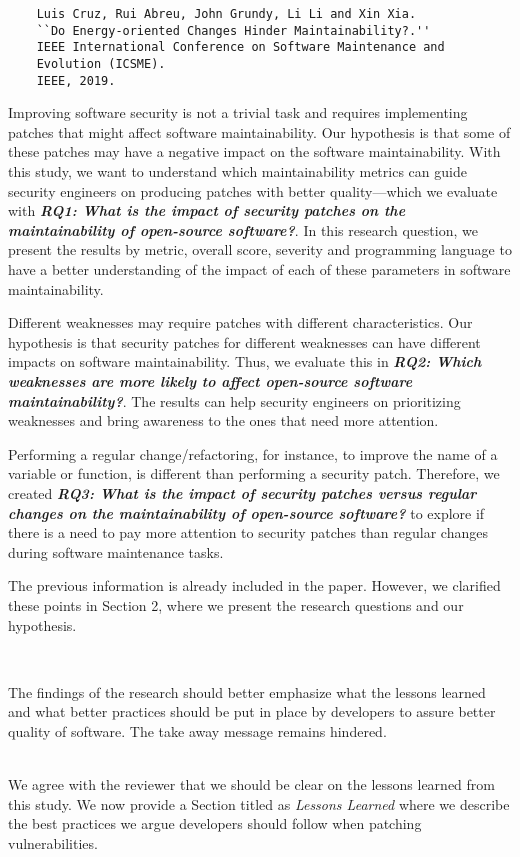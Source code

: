 \documentclass[11pt,fleqn]{article}
\newcommand{\eline}{\vspace*{.75\baselineskip}}
\newcommand{\Referee}[1]{\eline \noindent {\bf Reviewer comment #1:} \\}
\newcommand{\Us}{\eline \noindent {\bf Response:}\\}
\newenvironment{revcomment}[1][]
{\Referee{#1}\begin{rcomment}}
{\end{rcomment}}
\begin{document}
\begin{verbatim}
    Luis Cruz, Rui Abreu, John Grundy, Li Li and Xin Xia. 
    ``Do Energy-oriented Changes Hinder Maintainability?.'' 
    IEEE International Conference on Software Maintenance and 
    Evolution (ICSME). 
    IEEE, 2019.
\end{verbatim}

Improving software security is not a trivial task and 
requires implementing patches that might affect software 
maintainability. Our hypothesis is that some of these patches may 
have a negative impact on the software maintainability. With this 
study, we want to understand which maintainability metrics can guide 
security engineers on producing patches with better quality---which 
we evaluate with \textit{\textbf{RQ1: What is the impact of security patches on the
maintainability of open-source software?}}. In this research 
question, we present the results by metric, overall score, severity and programming language
to have a better understanding of the impact of each of these parameters in 
software maintainability. 

Different weaknesses may require patches with different characteristics. 
Our hypothesis
is that security patches for different weaknesses can have different 
impacts on software maintainability. Thus, we evaluate this in \textit{\textbf{RQ2: Which weaknesses are more likely to
affect open-source software maintainability?}}. The results can help
security engineers on prioritizing weaknesses and bring awareness to the 
ones that need more attention.

Performing a regular change/refactoring, for instance, to improve the name of 
a variable or function, is different than performing a security patch.
Therefore, we created \textit{\textbf{RQ3: What is the impact of security patches versus 
regular changes on the maintainability of open-source software?}}
to explore if there is a need to pay more attention to 
security patches than regular changes during software maintenance tasks.

The previous information is already included in the paper. However, 
we clarified these points in Section 2, where we present the research questions 
and our hypothesis. 


\begin{revcomment}[3.3]

    The findings of the research should better emphasize what the 
    lessons learned and what better practices should be put in place 
    by developers to assure better quality of software. The take away 
    message remains hindered. 

\end{revcomment}

\Us We agree with the reviewer that we should be clear on the lessons 
learned from this study. We now provide a Section titled as \textit{Lessons Learned} where 
we describe the best practices we argue developers should follow
when patching vulnerabilities.
\end{document}
